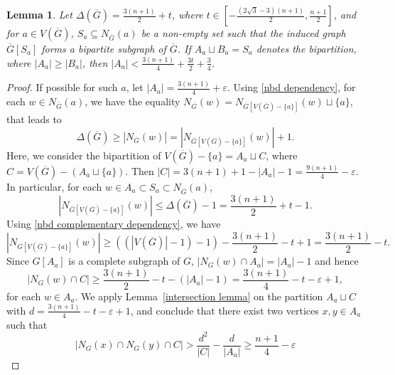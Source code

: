 \documentclass[reqno,10pt]{amsart}
\newtheorem{lemma}[theorem]{Lemma}
\theoremstyle{definition}
\begin{document}
\begin{lemma}\label{maximum bipartition}
Let $\Delta(\overline{G})= \frac{3(n+1)}{2}+t$, where $t\in[-\frac{(2\sqrt{3}-3)(n+1)}{2},\frac{n+1}{2}]$, and for $a\in V(\overline{G})$, $S_{a}\subseteq N_{\overline{G}}(a)$ be a non-empty set such that the induced graph  $\overline{G}[S_{a}]$ forms a bipartite subgraph of $\overline{G}$.  If $A_{a}\sqcup B_{a}=S_{a}$ denotes the bipartition, where $|A_{a}|\geq |B_{a}|$, then $|A_{a}|<\frac{3(n+1)}{4}+\frac{3t}{2}+\frac{3}{4}$.
\end{lemma}
\begin{proof}
If possible for such $a$, let $|A_{a}|= \frac{3(n+1)}{4}+\varepsilon$. Using \eqref{nbd dependency}, for each $w\in N_{\overline{G}}(a)$, we have the equality  $N_{\overline{G}}(w)=N_{\overline{G}[V(\overline{G})-\{a\}]}(w)\sqcup\{a\}$, that leads to
\begin{equation*}
\Delta(\overline{G})\geq|N_{\overline{G}}(w)|=|N_{\overline{G}[V(\overline{G})-\{a\}]}(w)|+1.   
\end{equation*}
Here, we consider the bipartition of 
$V(\overline{G})-\{a\}= A_{a}\sqcup C$, where $C=V(\overline{G})-(A_{a}\sqcup\{a\})$. Then $|C|=3(n+1)+1-|A_{a}|-1=\frac{9(n+1)}{4}-\varepsilon$. In particular, for each $w\in A_{a}\subset S_{a}\subset N_{\overline{G}}(a)$, 
\begin{equation*}
|N_{\overline{G}[V(\overline{G})-\{a\}]}(w)|\leq \Delta(\overline{G})-1= \frac{3(n+1)}{2}+t-1.    
\end{equation*}
Using \eqref{nbd complementary dependency}, we have
\begin{equation*}
|N_{G[V(\overline{G})-\{a\}]}(w)|\geq ((|V(\overline{G})|-1)-1)-\frac{3(n+1)}{2}-t+1=\frac{3(n+1)}{2}-t.  \end{equation*}
Since $G[A_{a}]$ is a complete subgraph of $G$, $|N_{G}(w)\cap A_{a}|=|A_{a}|-1$ and hence 
\begin{equation*}
|N_{G}(w)\cap C|\geq \frac{3(n+1)}{2}-t-(|A_{a}|-1)=\frac{3(n+1)}{4}-t-\varepsilon+1,
\end{equation*}
for each $w\in A_{a}$. We apply Lemma~\ref{intersection lemma} on the partition $A_{a}\sqcup C$ with $d=\frac{3(n+1)}{4}-t-\varepsilon+1$, and conclude that there exist two vertices $x,y\in A_{a}$ such that 
\begin{equation*}
|N_{G}(x)\cap N_{G}(y)\cap C|>\frac{d^{2}}{|C|}-\frac{d}{|A_{a}|}\geq \frac{n+1}{4}-\varepsilon
\end{equation*}


\end{proof}
\end{document}
